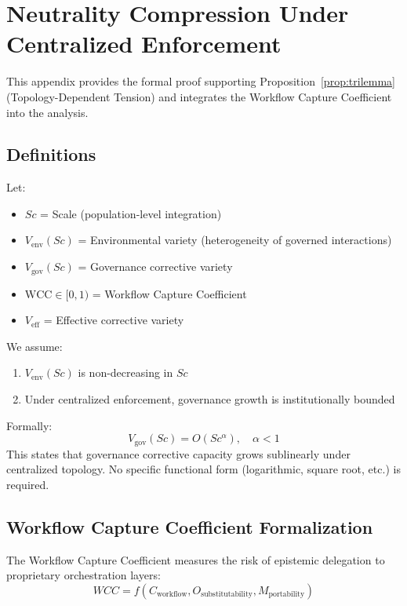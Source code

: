 \documentclass{article}
\begin{document}
\section{Neutrality Compression Under Centralized Enforcement}
\label{appendix:neutrality}

This appendix provides the formal proof supporting Proposition~\ref{prop:trilemma} (Topology-Dependent Tension) and integrates the Workflow Capture Coefficient into the analysis.

\subsection{Definitions}

Let:
\begin{itemize}[noitemsep]
    \item $Sc$ = Scale (population-level integration)
    \item $V_{\text{env}}(Sc)$ = Environmental variety (heterogeneity of governed interactions)
    \item $V_{\text{gov}}(Sc)$ = Governance corrective variety
    \item $\text{WCC} \in [0,1)$ = Workflow Capture Coefficient
    \item $V_{\text{eff}}$ = Effective corrective variety
\end{itemize}

We assume:
\begin{enumerate}[noitemsep]
    \item $V_{\text{env}}(Sc)$ is non-decreasing in $Sc$
    \item Under centralized enforcement, governance growth is institutionally bounded
\end{enumerate}

Formally:
\begin{equation}
V_{\text{gov}}(Sc) = O(Sc^{\alpha}), \quad \alpha < 1
\end{equation}
This states that governance corrective capacity grows sublinearly under centralized topology. No specific functional form (logarithmic, square root, etc.) is required.

\subsection{Workflow Capture Coefficient Formalization}

The Workflow Capture Coefficient measures the risk of epistemic delegation to proprietary orchestration layers:
\begin{equation}
WCC = f(C_{\text{workflow}}, O_{\text{substitutability}}, M_{\text{portability}})
\end{equation}
\end{document}
